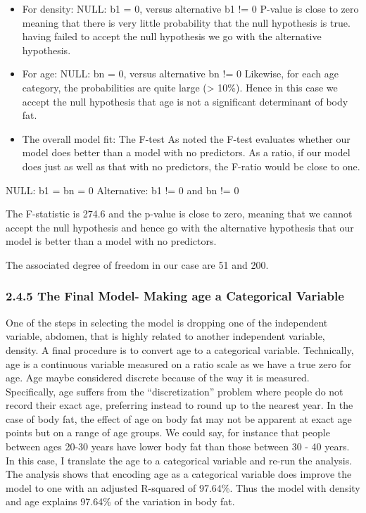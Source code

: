 \documentclass[
]{article}
\begin{document}
\begin{itemize}
\item
  For density: NULL: b1 = 0, versus alternative b1 != 0 P-value is close
  to zero meaning that there is very little probability that the null
  hypothesis is true. having failed to accept the null hypothesis we go
  with the alternative hypothesis.
\item
  For age: NULL: bn = 0, versus alternative bn != 0 Likewise, for each
  age category, the probabilities are quite large (\textgreater{} 10\%).
  Hence in this case we accept the null hypothesis that age is not a
  significant determinant of body fat.
\item
  The overall model fit: The F-test As noted the F-test evaluates
  whether our model does better than a model with no predictors. As a
  ratio, if our model does just as well as that with no predictors, the
  F-ratio would be close to one.
\end{itemize}

NULL: b1 = bn = 0 Alternative: b1 != 0 and bn != 0

The F-statistic is 274.6 and the p-value is close to zero, meaning that
we cannot accept the null hypothesis and hence go with the alternative
hypothesis that our model is better than a model with no predictors.

The associated degree of freedom in our case are 51 and 200.

\hypertarget{the-final-model--making-age-a-categorical-variable}{%
\subsubsection{\texorpdfstring{\textbf{2.4.5 The Final Model- Making age
a Categorical
Variable}}{2.4.5 The Final Model- Making age a Categorical Variable}}\label{the-final-model--making-age-a-categorical-variable}}

One of the steps in selecting the model is dropping one of the
independent variable, abdomen, that is highly related to another
independent variable, density. A final procedure is to convert age to a
categorical variable. Technically, age is a continuous variable measured
on a ratio scale as we have a true zero for age. Age maybe considered
discrete because of the way it is measured. Specifically, age suffers
from the ``discretization'' problem where people do not record their
exact age, preferring instead to round up to the nearest year. In the
case of body fat, the effect of age on body fat may not be apparent at
exact age points but on a range of age groups. We could say, for
instance that people between ages 20-30 years have lower body fat than
those between 30 - 40 years. In this case, I translate the age to a
categorical variable and re-run the analysis. The analysis shows that
encoding age as a categorical variable does improve the model to one
with an adjusted R-squared of 97.64\%. Thus the model with density and
age explains 97.64\% of the variation in body fat.
\end{document}
